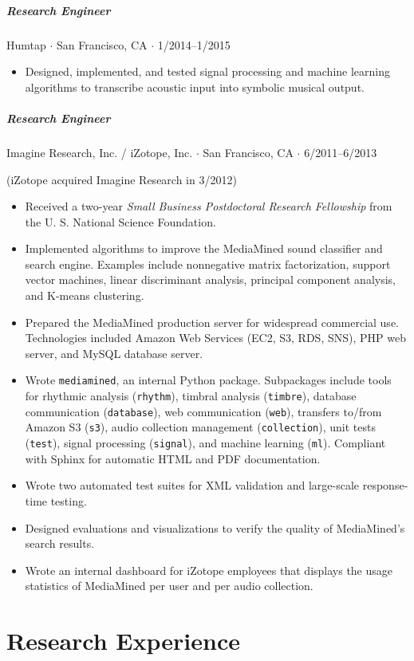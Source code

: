 \documentclass[10pt,letterpaper]{article}
\begin{document}
\subparagraph{Research Engineer}
Humtap  $\cdot$ San Francisco, CA $\cdot$ 1/2014--1/2015
\begin{itemize}
    \item Designed, implemented, and tested signal processing and machine learning algorithms to transcribe acoustic input into symbolic musical output.
\end{itemize}


\subparagraph{Research Engineer}
Imagine Research, Inc. / iZotope, Inc. $\cdot$ San Francisco, CA $\cdot$ 6/2011--6/2013 

(iZotope acquired Imagine Research in 3/2012)
\begin{itemize}
    \item Received a two-year \textit{Small Business Postdoctoral Research Fellowship} from the U. S. National Science Foundation.
    \item Implemented algorithms to improve the MediaMined sound classifier and search engine. Examples include nonnegative matrix factorization, support vector machines, linear discriminant analysis, principal component analysis, and K-means clustering.
    \item Prepared the MediaMined production server for widespread commercial use. Technologies included Amazon Web Services (EC2, S3, RDS, SNS), PHP web server, and MySQL database server.
    \item Wrote \texttt{mediamined}, an internal Python package. Subpackages include tools for rhythmic analysis (\texttt{rhythm}), timbral analysis (\texttt{timbre}), database communication (\texttt{database}), web communication (\texttt{web}), transfers to/from Amazon S3 (\texttt{s3}), audio collection management (\texttt{collection}), unit tests (\texttt{test}), signal processing (\texttt{signal}), and machine learning (\texttt{ml}). Compliant with Sphinx for automatic HTML and PDF documentation.
    \item Wrote two automated test suites for XML validation and large-scale response-time testing.
    \item Designed evaluations and visualizations to verify the quality of MediaMined's search results.
    \item Wrote an internal dashboard for iZotope employees that displays the usage statistics of MediaMined per user and per audio collection.
\end{itemize}


\section*{Research Experience}
\end{document}
